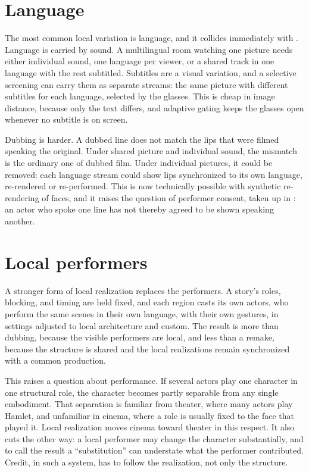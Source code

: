 \section{Language}

The most common local variation is language, and it collides immediately with . Language is carried by sound. A multilingual room watching one picture needs either individual sound, one language per viewer, or a shared track in one language with the rest subtitled. Subtitles are a visual variation, and a selective screening can carry them as separate streams: the same picture with different subtitles for each language, selected by the glasses. This is cheap in image distance, because only the text differs, and adaptive gating keeps the glasses open whenever no subtitle is on screen.

Dubbing is harder. A dubbed line does not match the lips that were filmed speaking the original. Under shared picture and individual sound, the mismatch is the ordinary one of dubbed film. Under individual pictures, it could be removed: each language stream could show lips synchronized to its own language, re-rendered or re-performed. This is now technically possible with synthetic re-rendering of faces, and it raises the question of performer consent, taken up in : an actor who spoke one line has not thereby agreed to be shown speaking another.

\section{Local performers}

A stronger form of local realization replaces the performers. A story's roles, blocking, and timing are held fixed, and each region casts its own actors, who perform the same scenes in their own language, with their own gestures, in settings adjusted to local architecture and custom. The result is more than dubbing, because the visible performers are local, and less than a remake, because the structure is shared and the local realizations remain synchronized with a common production.

This raises a question about performance. If several actors play one character in one structural role, the character becomes partly separable from any single embodiment. That separation is familiar from theater, where many actors play Hamlet, and unfamiliar in cinema, where a role is usually fixed to the face that played it. Local realization moves cinema toward theater in this respect. It also cuts the other way: a local performer may change the character substantially, and to call the result a ``substitution'' can understate what the performer contributed. Credit, in such a system, has to follow the realization, not only the structure.

